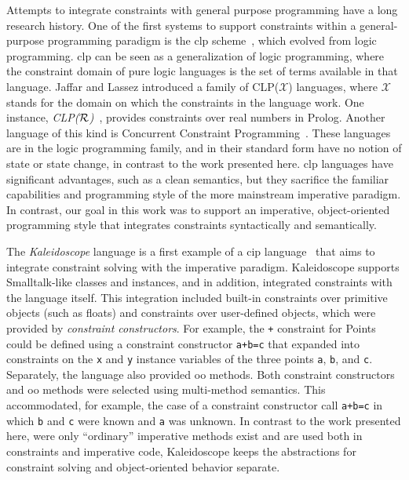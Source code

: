 Attempts to integrate constraints with general purpose programming have a long
research history. One of the first systems to support constraints within a
general-purpose programming paradigm is the \acrlong{clp} scheme~\cite{jaffar-popl-1987}, which evolved from logic programming. \ac{clp} can be
seen as a generalization of logic programming, where the constraint domain of
pure logic languages is the set of terms available in that language. Jaffar and
Lassez introduced a family of CLP($\mathcal{X}$) languages, where $\mathcal{X}$
stands for the domain on which the constraints in the language work. One
instance, \emph{CLP($\cal R$)}~\cite{jaffar-toplas-1992}, provides constraints over
real numbers in Prolog. Another language of this kind is Concurrent Constraint
Programming~\cite{saraswat-book}. These languages are in the logic programming
family, and in their standard form have no notion of state or state change, in
contrast to the work presented here. \ac{clp} languages have significant
advantages, such as a clean semantics, but they sacrifice the familiar
capabilities and programming style of the more mainstream imperative
paradigm. In contrast, our goal in this work was to support an imperative,
object-oriented programming style that integrates constraints syntactically and
semantically.

The \emph{Kaleidoscope} language %
is a first
example of a \acrlong{cip} language~\cite{freeman-benson-ecoop-1992} that aims
to integrate constraint solving with the imperative paradigm. Kaleidoscope
supports Smalltalk-like classes and instances, and in addition, integrated
constraints with the language itself. This integration included built-in
constraints over primitive objects (such as floats) and constraints over
user-defined objects, which were provided by \emph{constraint constructors}.
For example, the \lstinline{+} constraint for Points could be defined using a
constraint constructor \lstinline{a+b=c} that expanded into constraints on the
\lstinline{x} and \lstinline{y} instance variables of the three points
\lstinline{a}, \lstinline{b}, and \lstinline{c}.  Separately, the language also
provided \ac{oo} methods.  Both constraint constructors and \ac{oo} methods were
selected using multi-method semantics.  This accommodated, for example, the case
of a constraint constructor call \lstinline{a+b=c} in which \lstinline{b} and
\lstinline{c} were known and \lstinline{a} was unknown. In contrast to the work
presented here, were only ``ordinary'' imperative methods exist and are used
both in constraints and imperative code, Kaleidoscope keeps the abstractions for
constraint solving and object-oriented behavior separate.

